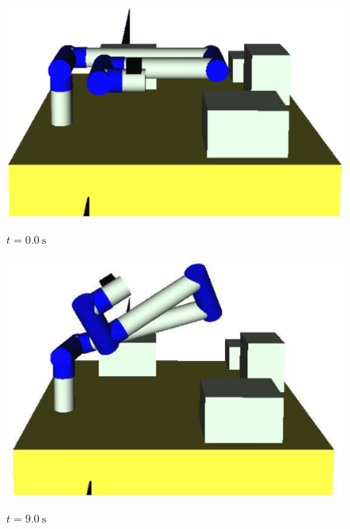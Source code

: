 \begin{figure}[t]
  \centering
  \begin{minipage}[h]{0.28\linewidth}
    \includegraphics[width=1.0\linewidth]{fig/chapter4/deployment/01.eps}
      \centering
      \par\footnotesize{$t = 0.0~\mathrm{s}$}
  \end{minipage}
  \begin{minipage}[h]{0.28\linewidth}
    \includegraphics[width=1.0\linewidth]{fig/chapter4/deployment/02.eps}
    \centering
    \par\footnotesize{$t = 9.0~\mathrm{s}$}
  \end{minipage}
  \begin{minipage}[h]{0.28\linewidth}

\end{minipage}
\end{figure}
